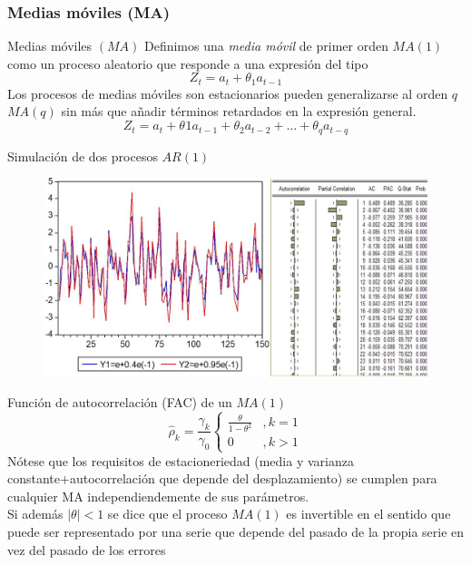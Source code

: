 \subsubsection{Medias móviles (MA)}
\begin{frame}{Medias móviles $(MA)$}
	Definimos una \textit{media móvil} de primer orden $MA(1)$ como un proceso aleatorio que responde a una expresión del tipo
		$$Z_t = a_t + \theta_1a_{t-1}$$
	Los procesos de medias móviles son estacionarios pueden generalizarse al orden $q$ $MA(q)$ sin más que añadir términos retardados en la expresión general.
		$$Z_t = a_t + \theta_{}1a_{t-1}+\theta_{2}a_{t-2} + \ldots + \theta_{q}a_{t-q}$$
\end{frame}
\begin{frame}{Simulación de dos procesos $AR(1)$}
	\centering
	\begin{figure}
		\includegraphics[width = 0.99\linewidth]{fig/figure9.jpg}
	\end{figure}
\end{frame}
\begin{frame}{Función de autocorrelación (FAC) de un $MA(1)$}
	\begin{equation*}
		\widehat{\rho}_k = \frac{\gamma_k}{\gamma_0} \begin{cases}
													 	\frac{\theta}{1-\theta^2} &, k=1\\
													 	0 &, k>1
													 \end{cases}
	\end{equation*}
	Nótese que los requisitos de estacioneriedad (media y varianza constante+autocorrelación que depende del desplazamiento) se cumplen para cualquier MA independiendemente de sus parámetros.\\
	
	Si además $|\theta|<1$ se dice que el proceso $MA(1)$ es invertible en el sentido que puede ser representado por una serie que depende del pasado de la propia serie en vez del pasado de los errores
\end{frame}

